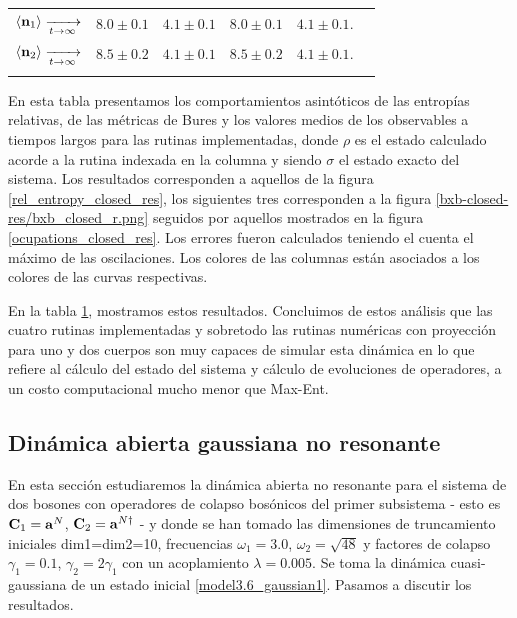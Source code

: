 \documentclass{report} %
\newcommand{\lgg}{\langle}
\newcommand{\rgg}{\rangle}
\numberwithin{equation}{section}
\begin{document}
\begin{table}
\begin{tabular}{llllll}
        $\lgg {\bf n}_1 \rgg\xrightarrow[t\rightarrow\infty]{}$ & $8.0 \pm 0.1$ & $4.1 \pm 0.1$ & $8.0 \pm 0.1$ & $4.1 \pm 0.1$.\\
        $\lgg {\bf n}_2 \rgg\xrightarrow[t\rightarrow\infty]{}$ & $8.5 \pm 0.2$ & $4.1 \pm 0.1$ & $8.5 \pm 0.2$ & $4.1 \pm 0.1$.\\ \\
        \bottomrule
     \end{tabular} 
    \begin{tablenotes}
      \small
      \item En esta tabla presentamos los comportamientos asintóticos de las entropías relativas, de las métricas de Bures y los valores medios de los observables a tiempos largos para las rutinas implementadas, donde $\rho$ es el estado calculado acorde a la rutina indexada en la columna y siendo $\sigma$ el estado exacto del sistema. Los resultados corresponden a aquellos de la figura \ref{rel_entropy_closed_res}, los siguientes tres corresponden a la figura \ref{bxb-closed-res/bxb_closed_r.png} seguidos por aquellos mostrados en la figura \ref{ocupations_closed_res}. Los errores fueron calculados teniendo el cuenta el máximo de las oscilaciones. Los colores de las columnas están asociados a los colores de las curvas respectivas. 
    \end{tablenotes}
    \label{table2}
\end{table}

En la tabla \ref{table2}, mostramos estos resultados. Concluimos de estos análisis que las cuatro rutinas implementadas y sobretodo las rutinas numéricas con proyección para uno y dos cuerpos son muy capaces de simular esta dinámica en lo que refiere al cálculo del estado del sistema y cálculo de evoluciones de operadores, a un costo computacional mucho menor que Max-Ent. 

\clearpage

\subsection{Dinámica abierta gaussiana no resonante }
\label{bxb_or}

En esta sección estudiaremos la dinámica abierta no resonante para el sistema de dos bosones con operadores de colapso bosónicos del primer subsistema - esto es ${\bf C}_1 = {\bf a}^{N}$, ${\bf C}_2 = {\bf a}^{N\dagger}$ -  y donde se han tomado las dimensiones de truncamiento iniciales dim1=dim2=10, frecuencias $\omega_1 = 3.0$, $\omega_2 = \sqrt{48}$ y factores de colapso $\gamma_1 = 0.1$, $\gamma_2 = 2 \gamma_1$ con un acoplamiento $\lambda = 0.005$. Se toma la dinámica cuasi-gaussiana de un estado inicial \eqref{model3.6_gaussian1}. Pasamos a discutir los resultados.
\end{document}
